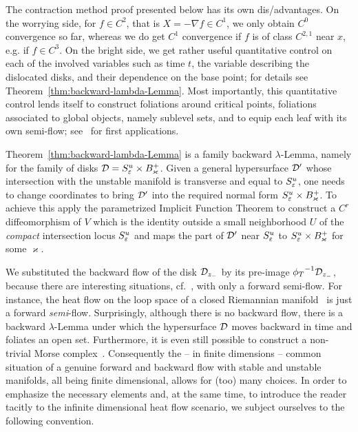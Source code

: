 \documentclass{article}
\begin{document}
\begin{remark}\label{rmk:pro-con-lambda}
The contraction method proof presented below has its own dis/advantages.
On the worrying side, for $f\in C^2$, that is $X=-\nabla f\in C^1$,
we only obtain $C^0$ convergence so far, whereas we do get $C^1$
convergence if $f$ is of class $C^{2,1}$ near $x$, e.g. if $f\in C^3$.
On the bright side, we get rather useful quantitative control on each of the involved
variables such as time $t$, the variable describing the dislocated disks, and their
dependence on the base point; for details see
Theorem~\ref{thm:backward-lambda-Lemma}.
Most importantly, this quantitative control lends itself to construct foliations around
critical points, foliations associated to global objects, namely sublevel sets,
and to equip each leaf with its own semi-flow;
see~\cite{weber:2014c,weber:2014e} for first applications.
\end{remark}

\begin{remark}\label{rem:general-D}
Theorem~\ref{thm:backward-lambda-Lemma} is
a family backward $\lambda$-Lemma, namely
for the family of disks ${\mathcal{D}}=S^u_{\varepsilon}\times B^+_\varkappa$.
Given a general hypersurface ${\mathcal{D}}^\prime$ whose intersection with the unstable
manifold is transverse and equal to $S^u_{\varepsilon}$, one needs to change
coordinates to bring ${\mathcal{D}}^\prime$ into the required normal form
$S^u_{\varepsilon}\times B^+_\varkappa$. To achieve this apply the parametrized Implicit Function Theorem
to construct a $C^r$ diffeomorphism of $V$ which is the identity outside a small
neighborhood $U$ of the \emph{compact} intersection locus $S^u_{\varepsilon}$ and maps the
part of ${\mathcal{D}}^\prime$ near $S^u_{\varepsilon}$ to $S^u_{\varepsilon}\times B^+_\varkappa$
for some $\varkappa$.
\end{remark}

We substituted the backward flow of the disk ${\mathcal{D}}_{z_-}$
by its pre-image ${\phi_T}^{-1}{\mathcal{D}}_{z_-}$, because there are
interesting situations, cf.~\cite{henry:1981a}, with only a forward
semi-flow. For instance, the heat flow on the loop space of a closed Riemannian
manifold~\cite{salamon:2006a} is just a forward \emph{semi}-flow.
Surprisingly, although there is no backward flow, there is a
backward $\lambda$-Lemma\cite{weber:2014a} under which the hypersurface ${\mathcal{D}}$
moves backward in time and foliates an open set.
Furthermore, it is even still possible to construct a non-trivial Morse
complex~\cite{weber:2013b,weber:2014c}.
%
Consequently the -- in finite dimensions -- common situation
of a genuine forward and backward flow with stable and
unstable manifolds, all being finite dimensional, allows for (too) many choices.
In order to emphasize the necessary elements and, at
the same time, to introduce the reader tacitly to the infinite dimensional
heat flow scenario, we subject ourselves to the following convention.
\end{document}
